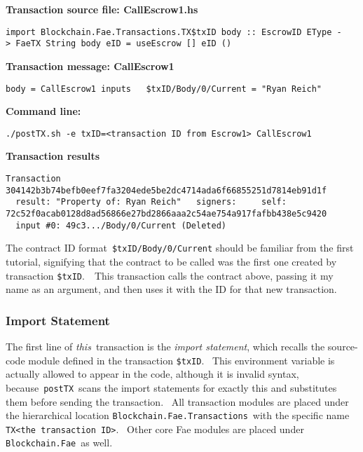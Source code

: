 \documentclass[11pt]{article}
\newcommand{\codeblock}[1]{\begin{mdframed}[
    backgroundcolor=header-color,
    linecolor=header-color,
    innertopmargin=10pt,
    ]{\texttt{#1}}\end{mdframed}}
\begin{document}

\vspace{11pt}

\textbf{Transaction source file: CallEscrow1.hs}

\codeblock{import Blockchain.Fae.Transactions.TX\$txID\newline
\newline
body :: EscrowID EType -\textgreater{} FaeTX String\newline
body eID = useEscrow {[}{]} eID ()}

\textbf{Transaction message: CallEscrow1}

\codeblock{body = CallEscrow1\newline
inputs\newline
  \$txID\slash{}Body\slash{}0\slash{}Current = "Ryan Reich"}

\textbf{Command line:}

\codeblock{.\slash{}postTX.sh -e txID=\textless{}transaction ID from Escrow1\textgreater{} CallEscrow1}

\textbf{Transaction results}

\codeblock{Transaction 304142b3b74befb0eef7fa3204ede5be2dc4714ada6f66855251d7814eb91d1f\newline
  result: "Property of: Ryan Reich"\newline
  signers:\newline
    self: 72c52f0acab0128d8ad56866e27bd2866aaa2c54ae754a917fafbb438e5c9420\newline
  input \#0: 49c3...\slash{}Body\slash{}0\slash{}Current (Deleted)}

The contract ID format \texttt{\$txID\slash{}Body\slash{}0\slash{}Current} should be familiar from the first tutorial, signifying that the contract to be called was the first one created by transaction \texttt{\$txID}.  This transaction calls the contract above, passing it my name as an argument, and then uses it with the ID for that new transaction.

\subsubsection{Import Statement}
\vspace{5.5pt}

The first line of \textit{this} transaction is the \textit{import statement}, which recalls the source-code module defined in the transaction \texttt{\$txID}.  This environment variable is actually allowed to appear in the code, although it is invalid syntax, because \texttt{postTX} scans the import statements for exactly this and substitutes them before sending the transaction.  All transaction modules are placed under the hierarchical location \texttt{Blockchain.Fae.Transactions} with the specific name \texttt{TX}\texttt{\textless{}}\texttt{the transaction ID}\texttt{\textgreater{}}.  Other core Fae modules are placed under \texttt{Blockchain.Fae} as well.
\end{document}
